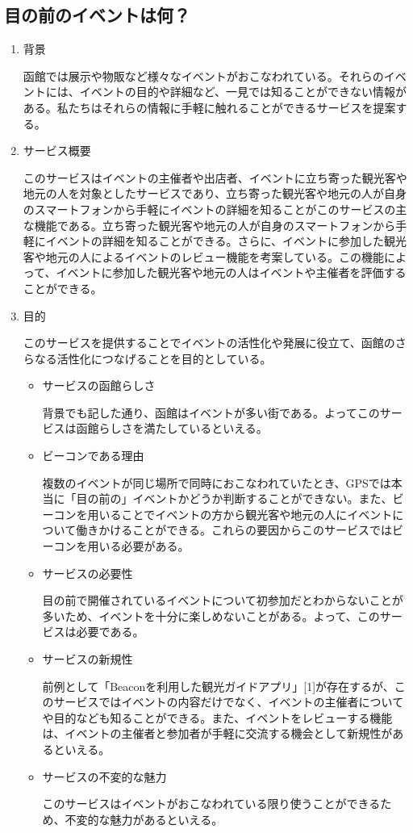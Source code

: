 \subsection{目の前のイベントは何？}
\begin{enumerate}
    \item 背景
    \par 函館では展示や物販など様々なイベントがおこなわれている。それらのイベントには、イベントの目的や詳細など、一見では知ることができない情報がある。私たちはそれらの情報に手軽に触れることができるサービスを提案する。
    \item サービス概要
    \par このサービスはイベントの主催者や出店者、イベントに立ち寄った観光客や地元の人を対象としたサービスであり、立ち寄った観光客や地元の人が自身のスマートフォンから手軽にイベントの詳細を知ることがこのサービスの主な機能である。立ち寄った観光客や地元の人が自身のスマートフォンから手軽にイベントの詳細を知ることができる。さらに、イベントに参加した観光客や地元の人によるイベントのレビュー機能を考案している。この機能によって、イベントに参加した観光客や地元の人はイベントや主催者を評価することができる。
    \item 目的
    \par このサービスを提供することでイベントの活性化や発展に役立て、函館のさらなる活性化につなげることを目的としている。    
\begin{itemize}
        \item サービスの函館らしさ
        \par 背景でも記した通り、函館はイベントが多い街である。よってこのサービスは函館らしさを満たしているといえる。
        \item ビーコンである理由
        \par 複数のイベントが同じ場所で同時におこなわれていたとき、GPSでは本当に「目の前の」イベントかどうか判断することができない。また、ビーコンを用いることでイベントの方から観光客や地元の人にイベントについて働きかけることができる。これらの要因からこのサービスではビーコンを用いる必要がある。
        \item サービスの必要性
        \par 目の前で開催されているイベントについて初参加だとわからないことが多いため、イベントを十分に楽しめないことがある。よって、このサービスは必要である。
        \item サービスの新規性
        \par 前例として「Beaconを利用した観光ガイドアプリ」[1]が存在するが、このサービスではイベントの内容だけでなく、イベントの主催者についてや目的なども知ることができる。また、イベントをレビューする機能は、イベントの主催者と参加者が手軽に交流する機会として新規性があるといえる。
        \item サービスの不変的な魅力
        \par このサービスはイベントがおこなわれている限り使うことができるため、不変的な魅力があるといえる。
    \end{itemize}
\end{enumerate}

